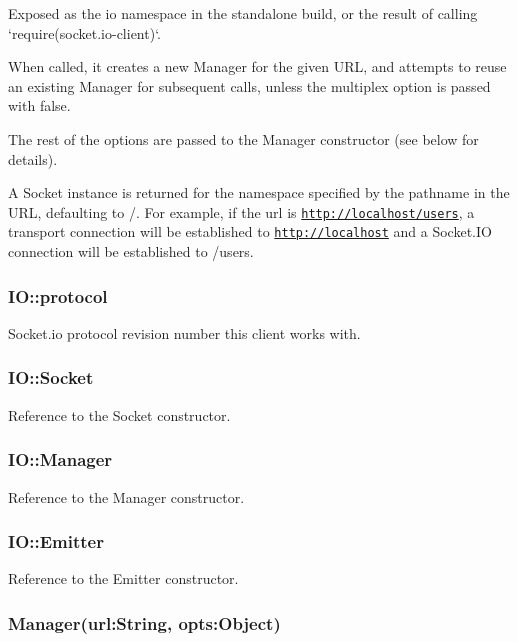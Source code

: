 Exposed as the {\ttfamily io} namespace in the standalone build, or the result of calling `require(\textquotesingle{}socket.\+io-\/client\textquotesingle{})`.

When called, it creates a new {\ttfamily Manager} for the given U\+RL, and attempts to reuse an existing {\ttfamily Manager} for subsequent calls, unless the {\ttfamily multiplex} option is passed with {\ttfamily false}.

The rest of the options are passed to the {\ttfamily Manager} constructor (see below for details).

A {\ttfamily Socket} instance is returned for the namespace specified by the pathname in the U\+RL, defaulting to {\ttfamily /}. For example, if the {\ttfamily url} is {\ttfamily \href{http://localhost/users}{\tt http\+://localhost/users}}, a transport connection will be established to {\ttfamily \href{http://localhost}{\tt http\+://localhost}} and a Socket.\+IO connection will be established to {\ttfamily /users}.

\subsubsection*{I\+O\+::protocol}

Socket.\+io protocol revision number this client works with.

\subsubsection*{I\+O\+::\+Socket}

Reference to the {\ttfamily Socket} constructor.

\subsubsection*{I\+O\+::\+Manager}

Reference to the {\ttfamily Manager} constructor.

\subsubsection*{I\+O\+::\+Emitter}

Reference to the {\ttfamily Emitter} constructor.

\subsubsection*{Manager(url\+:\+String, opts\+:\+Object)}

